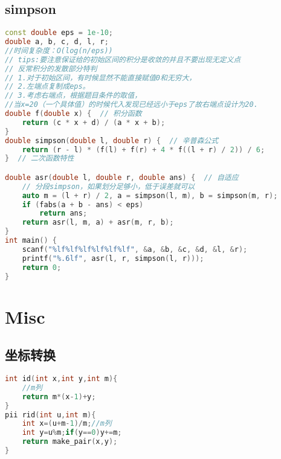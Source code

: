 \subsection{simpson}
\begin{lstlisting}[language=C++]
const double eps = 1e-10;
double a, b, c, d, l, r;
//时间复杂度：O(log(n/eps))
// tips:要注意保证给的初始区间的积分是收敛的并且不要出现无定义点
// 反常积分的发散部分特判
// 1.对于初始区间，有时候显然不能直接赋值0和无穷大，
// 2.左端点复制成eps。
// 3.考虑右端点，根据题目条件的取值，
//当x=20（一个具体值）的时候代入发现已经远小于eps了故右端点设计为20.
double f(double x) {  // 积分函数
    return (c * x + d) / (a * x + b);
}
double simpson(double l, double r) {  // 辛普森公式
    return (r - l) * (f(l) + f(r) + 4 * f((l + r) / 2)) / 6;
}  // 二次函数特性

double asr(double l, double r, double ans) {  // 自适应
    // 分段simpson，如果划分足够小，低于误差就可以
    auto m = (l + r) / 2, a = simpson(l, m), b = simpson(m, r);
    if (fabs(a + b - ans) < eps)
        return ans;
    return asr(l, m, a) + asr(m, r, b);
}
int main() {
    scanf("%lf%lf%lf%lf%lf%lf", &a, &b, &c, &d, &l, &r);
    printf("%.6lf", asr(l, r, simpson(l, r)));
    return 0;
}
\end{lstlisting}
\section{Misc}
\subsection{坐标转换}
\begin{lstlisting}[language=C++]
int id(int x,int y,int m){
	//m列
	return m*(x-1)+y;
}
pii rid(int u,int m){
	int x=(u+m-1)/m;//m列
	int y=u%m;if(y==0)y+=m;
	return make_pair(x,y);
}

\end{lstlisting}
